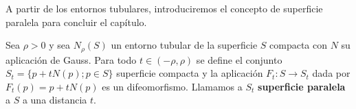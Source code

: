 A partir de los entornos tubulares, introduciremos el concepto de superficie paralela para concluir el capítulo.

\begin{definition}
Sea $\rho > 0$ y sea $N_\rho(S)$ un entorno tubular de la superficie $S$ compacta con $N$ su aplicación de Gauss. Para todo $t \in (-\rho, \rho)$ se define el conjunto $S_t=\{p + tN(p); p \in S\}$ superficie compacta y la aplicación $F_t: S \longrightarrow S_t$ dada por $F_t(p)=p+tN(p)$ es un difeomorfismo.
Llamamos a $S_t$ \textbf{superficie paralela} a $S$ a una distancia $t$.
\end{definition}

